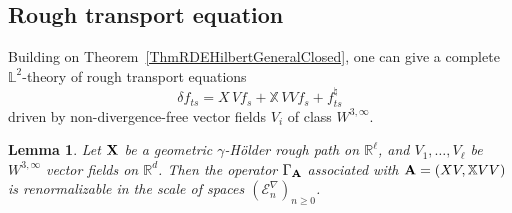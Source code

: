 \documentclass[11pt,a4paper]{amsart}
\newcommand{\RR}{\mathbb{R}}  \newcommand{\CC}{\mathbb{C}}  \newcommand{\LL}{\mathbb{L}}  \newcommand{\WW}{\mathbb{W}}
\newcommand{\mcE}{\mathcal{E}}
\newcommand{\bbX}{\mathbb{X}}
\renewcommand{\geq}{\geqslant}
\theoremstyle{plain}%
\newtheorem{lemma}[theorem]{Lemma}
\theoremstyle{definition}
\theoremstyle{remark}
\numberwithin{equation}{section} %
\begin{document}
\medskip


\subsection{Rough transport equation}
\label{SubsectionL2Transport}

Building on Theorem~\ref{ThmRDEHilbertGeneralClosed}, one can give a complete $\LL^2$-theory of rough transport equations 
\begin{equation*}
\delta f_{ts} = X\,Vf_s +  \bbX\,V V f_s + f^\natural_{ts}
\end{equation*} 
driven by non-divergence-free vector fields $V_i$ of class $W^{3,\infty}$.

\medskip

\begin{lemma}
\label{LemmaGammaA}
Let ${\bf X}$ be a geometric $\gamma$-H\"older rough path on $\RR^\ell$, and $V_1,\dots,V_\ell$ be $W^{3,\infty}$ vector fields on $\RR^d$. Then the operator $\Gamma_{\bf A}$ associated with ${\bfA} = (XV, \bbX VV)$ is renormalizable in the scale of spaces $(\mcE^\nabla_n)_{n\geq 0}$.
\end{lemma}

\smallskip 
\end{document}
